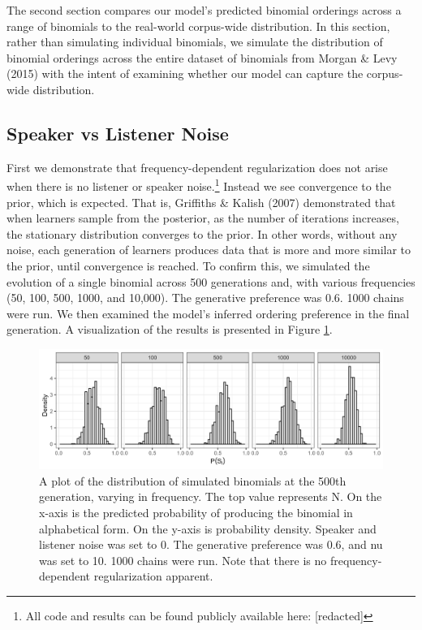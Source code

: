 \documentclass[10pt, letterpaper]{article}
\newenvironment{CodeChunk}{}{}
\begin{document}
The second section compares our model's predicted binomial orderings
across a range of binomials to the real-world corpus-wide distribution.
In this section, rather than simulating individual binomials, we
simulate the distribution of binomial orderings across the entire
dataset of binomials from Morgan \& Levy (2015) with the intent of
examining whether our model can capture the corpus-wide distribution.

\hypertarget{speaker-vs-listener-noise}{%
\subsection{Speaker vs Listener Noise}\label{speaker-vs-listener-noise}}

First we demonstrate that frequency-dependent regularization does not
arise when there is no listener or speaker noise.\footnote{All code and
  results can be found publicly available here: {[}redacted{]}} Instead
we see convergence to the prior, which is expected. That is, Griffiths
\& Kalish (2007) demonstrated that when learners sample from the
posterior, as the number of iterations increases, the stationary
distribution converges to the prior. In other words, without any noise,
each generation of learners produces data that is more and more similar
to the prior, until convergence is reached. To confirm this, we
simulated the evolution of a single binomial across 500 generations and,
with various frequencies (50, 100, 500, 1000, and 10,000). The
generative preference was 0.6. 1000 chains were run. We then examined
the model's inferred ordering preference in the final generation. A
visualization of the results is presented in Figure
\ref{fig:noNoisePlot}.

\begin{CodeChunk}
\begin{figure}[tb]

{\centering \includegraphics[width=1\linewidth]{Figures/noNoise} 

}

\caption[A plot of the distribution of simulated binomials at the 500th generation, varying in frequency]{A plot of the distribution of simulated binomials at the 500th generation, varying in frequency. The top value represents N. On the x-axis is the predicted probability of producing the binomial in alphabetical form. On the y-axis is probability density. Speaker and listener noise was set to 0. The generative preference was 0.6, and nu was set to 10. 1000 chains were run. Note that there is no frequency-dependent regularization apparent.}\label{fig:noNoisePlot}
\end{figure}
\end{CodeChunk}
\end{document}
